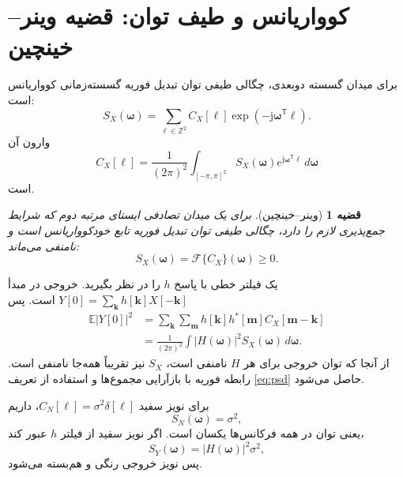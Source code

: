 \documentclass[12pt,openany,oneside]{book}
\newtheorem{theorem}{قضیه}[chapter]
\newcommand{\Z}{\mathbb{Z}}
\newcommand{\E}{\mathbb{E}}
\newcommand{\trans}{^{\mathsf T}}
\newcommand{\vect}[1]{\bm{#1}}
\begin{document}
\section{کوواریانس و طیف توان: قضیه وینر--خینچین}

برای میدان  گسسته دوبعدی، چگالی طیفی توان تبدیل فوریه گسسته‌زمانی کوواریانس است:
\begin{equation}
S_X(\vect \omega)
=
\sum_{\vect \ell\in\Z^2}C_X[\vect \ell]
\exp(-\mathrm j\vect\omega\trans\vect\ell).
\label{eq:psd}
\end{equation}
وارون آن
\begin{equation}
C_X[\vect \ell]
=
\frac{1}{(2\pi)^2}\int_{[-\pi,\pi]^2}
S_X(\vect\omega)e^{\mathrm j\vect\omega\trans\vect\ell}
\,d\vect\omega
\label{eq:inverse-psd}
\end{equation}
است.

\begin{theorem}[وینر--خینچین]
برای یک میدان تصادفی ایستای مرتبه دوم که شرایط جمع‌پذیری لازم را دارد، چگالی طیفی توان تبدیل فوریه
تابع خودکوواریانس است و نامنفی می‌ماند:
\begin{equation}
S_X(\vect\omega)=\mathcal F\{C_X\}(\vect\omega)\ge 0.
\end{equation}
\end{theorem}

\begin{proofbox}
یک فیلتر خطی با پاسخ \(h\) را در نظر بگیرید. خروجی در مبدأ
\(Y[0]=\sum_{\vect{k}}h[\vect{k}]X[-\vect{k}]\) است. پس
\begin{align}
\E|Y[0]|^2
&=\sum_{\vect{k}}\sum_{\vect{m}}
 h[\vect{k}]h^*[\vect{m}]C_X[\vect{m}-\vect{k}]\\
&=\frac{1}{(2\pi)^2}\int |H(\vect\omega)|^2S_X(\vect\omega)\,d\vect\omega.
\end{align}
از آنجا که توان خروجی برای هر \(H\) نامنفی است، \(S_X\) نیز تقریباً همه‌جا نامنفی است.
رابطه فوریه با بازآرایی مجموع‌ها و استفاده از تعریف \eqref{eq:psd} حاصل می‌شود.
\end{proofbox}

برای نویز سفید \(C_N[\vect\ell]=\sigma^2\delta[\vect\ell]\)، داریم
\begin{equation}
S_N(\vect\omega)=\sigma^2,
\end{equation}
یعنی توان در همه فرکانس‌ها یکسان است. اگر نویز سفید از فیلتر \(h\) عبور کند،
\begin{equation}
S_Y(\vect\omega)=|H(\vect\omega)|^2\sigma^2,
\end{equation}
پس نویز خروجی رنگی و هم‌بسته می‌شود.
\end{document}
